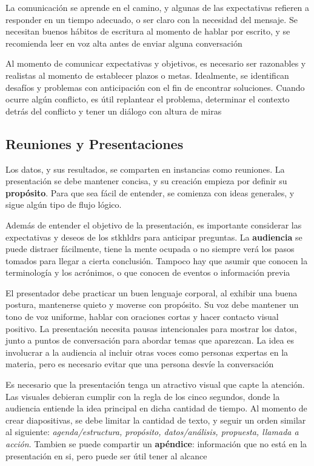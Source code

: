 La comunicación se aprende en el camino, y algunas de las expectativas refieren a responder en un tiempo adecuado, o ser claro con la necesidad del mensaje. Se necesitan buenos hábitos de escritura al momento de hablar por escrito, y se recomienda leer en voz alta antes de enviar alguna conversación

Al momento de comunicar expectativas y objetivos, es necesario ser razonables y realistas al momento de establecer plazos o metas. Idealmente, se identifican desafíos y problemas con anticipación con el fin de encontrar soluciones. Cuando ocurre algún conflicto, es útil replantear el problema, determinar el contexto detrás del conflicto y tener un diálogo con altura de miras

\subsection{Reuniones y Presentaciones}
Los datos, y sus resultados, se comparten en instancias como reuniones. La presentación se debe mantener concisa, y su creación empieza por definir su \textbf{propósito}. Para que sea fácil de entender, se comienza con ideas generales, y sigue algún tipo de flujo lógico. 

Además de entender el objetivo de la presentación, es importante considerar las expectativas y deseos de los \gls{stkhldrs} para anticipar preguntas. La \textbf{audiencia} se puede distraer fácilmente, tiene la mente ocupada o no siempre verá los pasos tomados para llegar a cierta conclusión. Tampoco hay que asumir que conocen la terminología y los acrónimos, o que conocen de eventos o información previa 

El presentador debe practicar un buen lenguaje corporal, al exhibir una buena postura, mantenerse quieto y moverse con propósito. Su voz debe mantener un tono de voz uniforme, hablar con oraciones cortas y hacer contacto visual positivo. La presentación necesita pausas intencionales para mostrar los datos, junto a puntos de conversación para abordar temas que aparezcan. La idea es involucrar a la audiencia al incluir otras voces como personas expertas en la materia, pero es necesario evitar que una persona desvíe la conversación

Es necesario que la presentación tenga un atractivo visual que capte la atención. Las visuales debieran cumplir con la regla de los cinco segundos, donde la audiencia entiende la idea principal en dicha cantidad de tiempo. Al momento de crear diapositivas, se debe limitar la cantidad de texto, y seguir un orden similar al siguiente: \textit{agenda/estructura, propósito, datos/análisis, propuesta, llamada a acción}. Tambien se puede compartir un \textbf{apéndice}: información que no está en la presentación en si, pero puede ser útil tener al alcance

